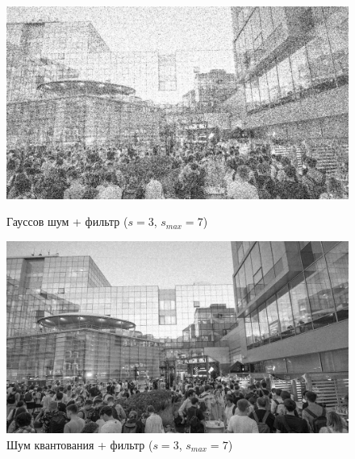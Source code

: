 \documentclass[a4paper]{article}
\begin{document}
\begin{figure}[H]
    \begin{minipage}{0.49\textwidth}
        \centering \includegraphics[width=\textwidth]{images/3_nonlinear_filters/gaussian - adaptive median (s_start=3, s_max=7).jpg}
        \caption{Гауссов шум + фильтр ($s = 3$, $s_{max}=7$)}
    \end{minipage}\hfill
    \begin{minipage}{0.49\textwidth}
        \centering \includegraphics[width=\textwidth]{images/3_nonlinear_filters/poisson - adaptive median (s_start=3, s_max=7).jpg}
        \caption{Шум квантования + фильтр ($s = 3$, $s_{max}=7$)}
    \end{minipage}
\end{figure}
\end{document}
